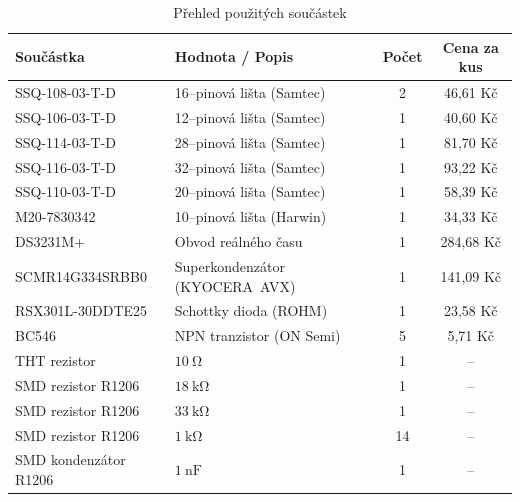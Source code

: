 \begin{table}[htbp]
    \centering
    \caption{Přehled použitých součástek}
    \label{tab:bom}
    \begin{tabularx}{\textwidth}{|X|X|c|c|}
        \hline
        \textbf{Součástka} & \textbf{Hodnota / Popis} & \textbf{Počet} & \textbf{Cena za kus} \\
        \hline
        SSQ-108-03-T-D      & 16--pinová lišta (Samtec)       & 2  & 46,61 Kč   \\ \hline
        SSQ-106-03-T-D      & 12--pinová lišta (Samtec)       & 1  & 40,60 Kč   \\ \hline
        SSQ-114-03-T-D      & 28--pinová lišta (Samtec)       & 1  & 81,70 Kč   \\ \hline
        SSQ-116-03-T-D      & 32--pinová lišta (Samtec)       & 1  & 93,22 Kč   \\ \hline
        SSQ-110-03-T-D      & 20--pinová lišta (Samtec)       & 1  & 58,39 Kč   \\ \hline
        M20-7830342         & 10--pinová lišta (Harwin)       & 1  & 34,33 Kč   \\ \hline
        DS3231M+            & Obvod reálného času             & 1  & 284,68 Kč  \\ \hline
        SCMR14G334SRBB0     & Superkondenzátor (\mbox{KYOCERA AVX})  & 1  & 141,09 Kč  \\ \hline
        RSX301L-30DDTE25    & Schottky dioda (ROHM)           & 1  & 23,58 Kč   \\ \hline
        BC546               & NPN tranzistor (ON Semi)        & 5  & 5,71 Kč    \\ \hline
        THT rezistor        & $\SI{10}{\ohm}$                 & 1  & --         \\ \hline
        SMD rezistor R1206  & $\SI{18}{\kilo\ohm}$            & 1  & --         \\ \hline
        SMD rezistor R1206  & $\SI{33}{\kilo\ohm}$            & 1  & --         \\ \hline
        SMD rezistor R1206  & $\SI{1}{\kilo\ohm}$             & 14 & --         \\ \hline
        SMD kondenzátor R1206  & $\SI{1}{\nano\farad}$        & 1  & --         \\ \hline
    \end{tabularx}
\end{table}

\newpage

